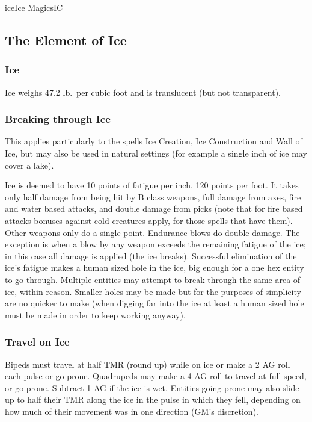 \begin{college}[1.5]{ice}{Ice Magics}{IC}
\subsection{The Element of Ice}

\subsubsection{Ice}

Ice weighs 47.2 lb.\ per cubic foot and is translucent (but not
transparent).

\subsubsection{Breaking through Ice}

This applies particularly to the spells Ice Creation, Ice Construction
and Wall of Ice, but may also be used in natural settings (for example
a single inch of ice may cover a lake).

Ice is deemed to have 10 points of fatigue per inch, 120 points per
foot.  It takes only half damage from being hit by B class weapons,
full damage from axes, fire and water based attacks, and double damage
from picks (note that for fire based attacks bonuses against cold
creatures apply, for those spells that have them).  Other weapons only
do a single point.  Endurance blows do double damage.  The exception
is when a blow by any weapon exceeds the remaining fatigue of the ice;
in this case all damage is applied (the ice breaks).  Successful
elimination of the ice's fatigue makes a human sized hole in the ice,
big enough for a one hex entity to go through.  Multiple entities may
attempt to break through the same area of ice, within reason.  Smaller
holes may be made but for the purposes of simplicity are no quicker to
make (when digging far into the ice at least a human sized hole must
be made in order to keep working anyway).

\subsubsection{Travel on Ice}
\label{ice:travel}

Bipeds must travel at half TMR (round up) while on ice or make a 2 \x
AG roll each pulse or go prone. Quadrupeds may make a 4 \x AG roll to
travel at full speed, or go prone.  Subtract 1 \x AG if the ice is
wet.  Entities going prone may also slide up to half their TMR along
the ice in the pulse in which they fell, depending on how much of
their movement was in one direction (GM's discretion).


\end{college}
